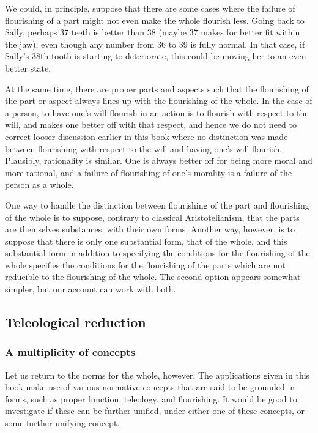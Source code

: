 We could, in principle, suppose that there are some cases where the failure of flourishing of a part might not even make the 
whole flourish less. Going back to Sally, perhaps 37 teeth is better than 38 (maybe 37 makes for better fit within the jaw),
even though any number from 36 to 39 is fully normal. In that case, if Sally's 38th tooth is starting to deteriorate, this could
be moving her to an even better state. 

At the same time, there are proper parts and aspects such that the flourishing of the part or aspect always lines up with the
flourishing of the whole. In the case of a person, to have one's will flourish in an action is to flourish with respect to the 
will, and makes one better off with that respect, and hence we do not need to correct looser discussion earlier in this book where
no distinction was made between flourishing with respect to the will and having one's will flourish. Plausibly, rationality is similar. 
One is always better off for being more moral and more rational, and a failure of flourishing of one's morality is a failure of the 
person as a whole. 

One way to handle the distinction between flourishing of the part and flourishing of the whole is to suppose,
contrary to classical Aristotelianism, that the parts are themselves substances, with their own forms. Another
way, however, is to suppose that there is only one substantial form, that of the whole, and this substantial
form in addition to specifying the conditions for the flourishing of the whole specifies the conditions for the
flourishing of the parts which are not reducible to the flourishing of the whole. The second option appears
somewhat simpler, but our account can work with both.

\subsection{Teleological reduction}
\subsubsection{A multiplicity of concepts}
Let us return to the norms for the whole, however.
The applications given in this book make use of various normative concepts that are said to be grounded in forms,
such as proper function, teleology, and flourishing. It would be good to investigate if these 
can be further unified, under either one of these concepts, or some further unifying concept.

